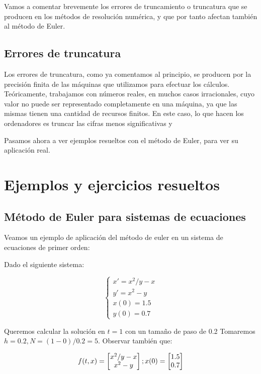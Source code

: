 \documentclass[12pt]{article}       %
\begin{document}
Vamos a comentar brevemente los errores de truncamiento o truncatura que se producen en los métodos de resolución numérica, y que por tanto afectan también al método de Euler.

\subsection{Errores de truncatura}

Los errores de truncatura, como ya comentamos al principio, se producen por la precisión finita de las máquinas que utilizamos para efectuar los cálculos. Teóricamente, trabajamos con números reales, en muchos casos irracionales, cuyo valor no puede ser representado completamente en una máquina, ya que las mismas tienen una cantidad de recursos finitos. En este caso, lo que hacen los ordenadores es truncar las cifras menos significativas y 

Pasamos ahora a ver ejemplos resueltos con el método de Euler, para ver su aplicación real.

\section{Ejemplos y ejercicios resueltos}

\subsection{Método de Euler para sistemas de ecuaciones}

Veamos un ejemplo de aplicación del método de euler en un sistema de ecuaciones de primer orden:

Dado el siguiente sistema:

$$
\begin{cases}
x' = x^2/y - x\\
y' = x^2-y \\
x(0) = 1.5\\
y(0)=0.7
\end{cases}
$$

Queremos calcular la solución en $t=1$ con un tamaño de paso de 0.2
Tomaremos $h=0.2, N=(1-0)/0.2=5$.
Observar también que:

\begin{equation*}
f(t,x)=\begin{bmatrix}
 x^2/y-x \\
 x^2-y \\
\end{bmatrix};\\
x(0)=\begin{bmatrix}
1.5 \\
0.7
\end{bmatrix}
\end{equation*}
 
\end{document}
